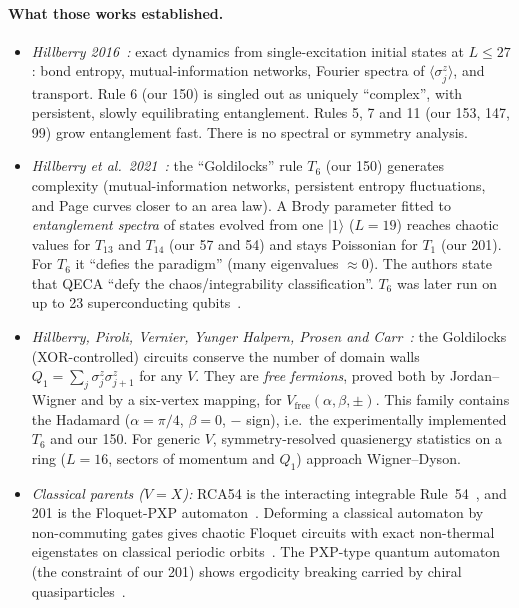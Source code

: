 \paragraph{What those works established.}
\begin{itemize}
\item \emph{Hillberry 2016~\cite{hillberry2016}:} exact dynamics from single-excitation initial states at $L\le27$:
  bond entropy, mutual-information networks, Fourier spectra of $\langle\sigma^z_j\rangle$, and transport. Rule 6 (our
  150) is singled out as uniquely ``complex'', with persistent, slowly equilibrating entanglement. Rules 5, 7 and 11
  (our 153, 147, 99) grow entanglement fast. There is no spectral or symmetry analysis.
\item \emph{Hillberry et al.\ 2021~\cite{hillberry2021}:} the ``Goldilocks'' rule $T_6$ (our 150) generates complexity
  (mutual-information networks, persistent entropy fluctuations, and Page curves closer to an area law). A Brody
  parameter fitted to \emph{entanglement spectra} of states evolved from one $|1\rangle$ ($L=19$) reaches chaotic values
  for $T_{13}$ and $T_{14}$ (our 57 and 54) and stays Poissonian for $T_1$ (our 201). For $T_6$ it ``defies the
  paradigm'' (many eigenvalues $\approx0$). The authors state that QECA ``defy the chaos/integrability classification''.
  $T_6$ was later run on up to 23 superconducting qubits~\cite{jones2022}.
\item \emph{Hillberry, Piroli, Vernier, Yunger Halpern, Prosen and Carr~\cite{hillberry2024}:} the Goldilocks
  (XOR-controlled) circuits conserve the number of domain walls $Q_1=\sum_j\sigma^z_j\sigma^z_{j+1}$ for any $V$. They
  are \emph{free fermions}, proved both by Jordan--Wigner and by a six-vertex mapping, for
  $V_\mathrm{free}(\alpha,\beta,\pm)$. This family contains the Hadamard ($\alpha=\pi/4$, $\beta=0$, $-$ sign), i.e.\ the
  experimentally implemented $T_6$ and our 150. For generic $V$, symmetry-resolved quasienergy statistics on a ring
  ($L=16$, sectors of momentum and $Q_1$) approach Wigner--Dyson.
\item \emph{Classical parents ($V=X$):} RCA54 is the interacting integrable Rule~54~\cite{buca2021}, and 201 is the
  Floquet-PXP automaton~\cite{wilkinson2020}. Deforming a classical automaton by non-commuting gates gives chaotic Floquet
  circuits with exact non-thermal eigenstates on classical periodic orbits~\cite{iadecola2020}. The PXP-type quantum
  automaton (the constraint of our 201) shows ergodicity breaking carried by chiral quasiparticles~\cite{sellapillay2022}.

\end{itemize}

